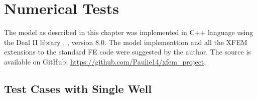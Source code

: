 \section{Numerical Tests}
\label{sec:pressure_results}

The model as described in this chapter was implemented in C++ language using the Deal II library \cite{bangerth_deal.ii_2007}, , version 8.0.
The model implementtion and all the XFEM extensions to the standard FE code were suggested by the author.
The source is available on GitHub: \url{https://github.com/Paulie14/xfem_project}.

% 
% 


\subsection{Test Cases with Single Well}
\label{sec:2d_results_single}


